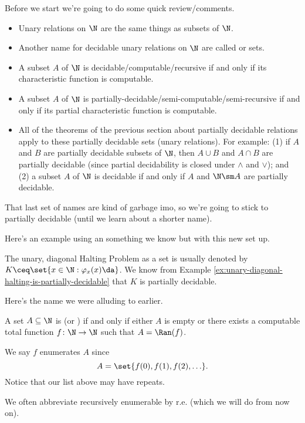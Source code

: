 \documentclass[class=article, crop=false]{standalone}
\begin{document}
Before we start we're going to do some quick review/comments.
\begin{itemize}
  \item Unary relations on $\N$ are the same things as subsets of $\N$.
  \item Another name for decidable unary relations on $\N$ are called  or  sets.
  \item A subset $A$ of $\N$ is decidable/computable/recursive if and only if its characteristic function is computable.
  \item A subset $A$ of $\N$ is partially-decidable/semi-computable/semi-recursive if and only if its partial characteristic function is computable.
  \item All of the theorems of the previous section about partially decidable relations apply to these partially decidable sets (unary relations). For example: (1) if $A$ and $B$ are partially decidable subsets of $\N$, then $A \cup B$ and $A \cap B$ are partially decidable (since partial decidability is closed under $\land$ and $\lor$); and (2) a subset $A$ of $\N$ is decidable if and only if $A$ and $\N \sm A$ are partially decidable.
\end{itemize}
\begin{rem}
  That last set of names are kind of garbage imo, so we're going to stick to partially decidable (until we learn about a shorter name).
\end{rem}

Here's an example using an something we know but with this new set up.
\begin{ex}
  The unary, diagonal Halting Problem as a set is usually denoted by $K \ceq \set{x \in \N : \varphi_x(x) \da}$. We know from Example \ref{ex:unary-diagonal-halting-is-partially-decidable} that $K$ is partially decidable.
\end{ex}

Here's the name we were alluding to earlier.
\begin{defn}
  A set $A \subseteq \N$ is  (or ) if and only if either $A$ is empty or there exists a computable total function $f\colon \N \to \N$ such that $A = \Ran(f)$.
\end{defn}
\begin{rem}
  We say $f$ enumerates $A$ since
    \[
      A = \set{f(0), f(1), f(2), \ldots}.
    \]
  Notice that our list above may have repeats.
\end{rem}
\begin{rem}
  We often abbreviate recursively enumerable by r.e. (which we will do from now on).
\end{rem}
\end{document}
